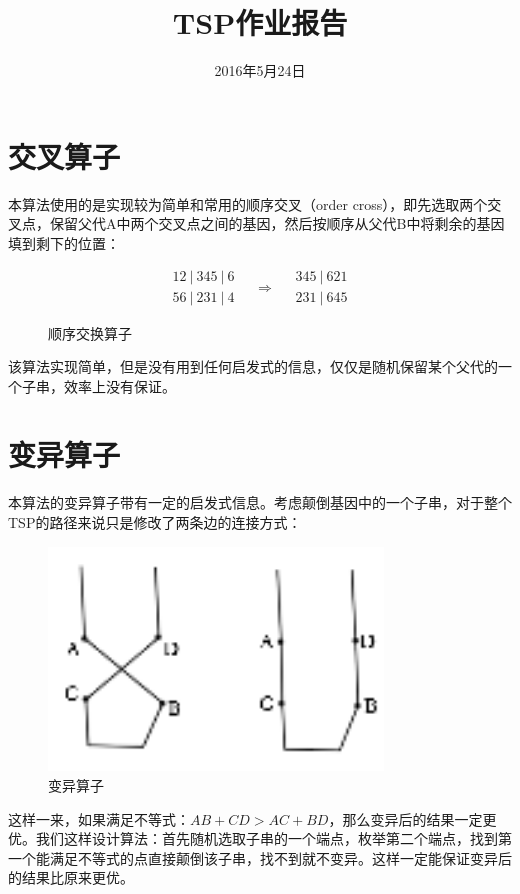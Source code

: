 \documentclass[a4paper]{ctexart}
\begin{document}
\setcounter{section}{0}
\setlength{\parindent}{0em}
\setlength{\parskip}{1.2ex}

\title{TSP作业报告}
\date{2016年5月24日}
\maketitle

\section{交叉算子}
本算法使用的是实现较为简单和常用的顺序交叉（order cross），即先选取两个交叉点，保留父代A中两个交叉点之间的基因，然后按顺序从父代B中将剩余的基因填到剩下的位置：
\begin{figure}[htbp]
\begin{large}
$$
\begin{aligned}
12\ |\ 345\ |\ 6\\
56\ |\ 231\ |\ 4
\end{aligned}
\quad \Longrightarrow \quad
\begin{aligned}
345\ |\ 621\\
231\ |\ 645
\end{aligned}
$$
\end{large}
\caption{顺序交换算子}
\end{figure}
\par
该算法实现简单，但是没有用到任何启发式的信息，仅仅是随机保留某个父代的一个子串，效率上没有保证。\par
\section{变异算子}
本算法的变异算子带有一定的启发式信息。考虑颠倒基因中的一个子串，对于整个TSP的路径来说只是修改了两条边的连接方式：\par
\begin{figure}[htbp]
\centering\includegraphics[width=3.5in]{1}
\caption{变异算子}
\end{figure}
这样一来，如果满足不等式：$AB + CD > AC + BD$，那么变异后的结果一定更优。我们这样设计算法：首先随机选取子串的一个端点，枚举第二个端点，找到第一个能满足不等式的点直接颠倒该子串，找不到就不变异。这样一定能保证变异后的结果比原来更优。\par
\end{document}
